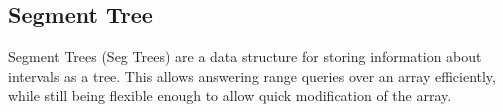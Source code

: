 \subsection*{Segment Tree}

Segment Trees (Seg Trees) are a data structure for storing information about intervals as a tree. This allows answering range queries over an array efficiently, while still being flexible enough to allow quick modification of the array.

